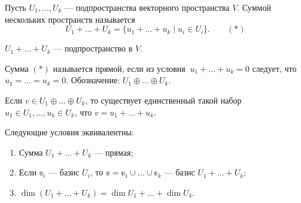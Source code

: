\begin{Def}
	Пусть $U_1, \ldots, U_k$ --- подпространства векторного пространства $V$. Суммой нескольких пространств называется 
	$$
	U_1 + \ldots + U_k = \{u_1 + \ldots + u_k \; | \; u_i \in U_i \}. \qquad (*)
	$$
\end{Def}

\begin{Task}
	$U_1+\ldots + U_k$ --- подпространство в $V$.
\end{Task}

\begin{Def}
	Сумма $(*)$ называется прямой, если  из условия $\:u_1 + \ldots + u_k = 0$ следует, что $u_1 = \ldots = u_k = 0$. Обозначение: $U_1 \oplus \ldots \oplus U_k$.
\end{Def}

\begin{Task}
	Если $v \in U_1 \oplus \ldots \oplus U_k$, то существует единственный такой набор \\$u_1 \in U_1, \ldots, u_k \in U_k$, что $v = u_1 + \ldots + u_k$.
\end{Task}

\begin{Theorem}
	Следующие условия эквивалентны:
	\begin{enumerate}
		\item Сумма $U_1 + \ldots + U_k$ --- прямая;
		\item Если $\mathbb{e}_i$ --- базис $U_i$, то $\mathbb{e} = \mathbb{e}_1 \cup \ldots \cup \mathbb{e}_k$ --- базис $U_1 + \ldots + U_k;$
		\item $\dim(U_1 + \ldots + U_k) = \dim{U_1} + \ldots + \dim{U_k}.$
	\end{enumerate}
\end{Theorem}

